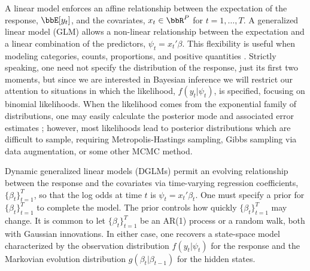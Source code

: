 \documentclass[12pt]{article}
\begin{document}
A linear model enforces an affine relationship between the expectation of the
response, $\bbE[y_t]$, and the covariates, $x_t \in \bbR^P$ for $t=1, \ldots,
T$.  A generalized linear model (GLM) allows a non-linear relationship between
the expectation and a linear combination of the predictors, $\psi_t = x_t'
\beta$.  This flexibility is useful when modeling categories, counts,
proportions, and positive quantities \citep{mccullagh-nelder-1989}.  Strictly
speaking, one need not specify the distribution of the response, just its first
two moments, but since we are interested in Bayesian inference we will restrict
our attention to situations in which the likelihood, $f(y_t | \psi_t)$, is
specified, focusing on binomial likelihoods.  When the likelihood comes from the
exponential family of distributions, one may easily calculate the posterior mode
and associated error estimates \citep{wedderburn-1974}; however, most
likelihoods lead to posterior distributions which are difficult to sample,
requiring Metropolis-Hastings sampling, Gibbs sampling via data augmentation, or
some other MCMC method.

Dynamic generalized linear models (DGLMs) permit an evolving relationship
between the response and the covariates via time-varying regression
coefficients, $\{\beta_t\}_{t=1}^T$, so that the log odds at time $t$ is $\psi_t
= x_t' \beta_t$.  One must specify a prior for $\{\beta_t\}_{t=1}^T$ to complete
the model.  The prior controls how quickly $\{\beta_t\}_{t=1}^T$ may change.  It
is common to let $\{\beta_t\}_{t=1}^T$ be an AR(1) process or a random walk,
both with Gaussian innovations.  In either case, one recovers a state-space
model characterized by the observation distribution $f(y_t | \psi_t)$ for the
response and the Markovian evolution distribution $g(\beta_t | \beta_{t-1})$ for
the hidden states.
\end{document}
